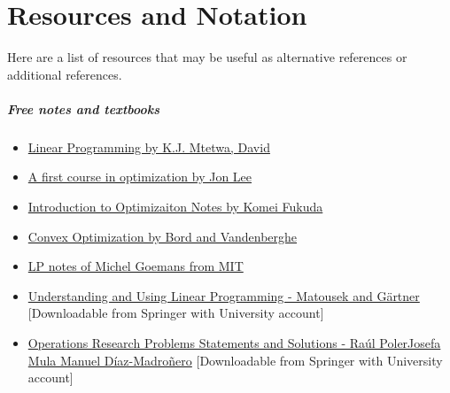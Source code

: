 \documentclass[letter,12pt]{book}
\renewcommand{\0}{\mathbf{0}}
\begin{document}
	\mainmatter
	
	


\chapter{Resources and Notation}
Here are a list of resources that may be useful as alternative references or additional references.

\paragraph{\textbf{Free notes and textbooks}}
\begin{itemize}
\item \href{https://oer.avu.org/handle/123456789/780}{Linear Programming by K.J. Mtetwa, David}
\item \href{http://www.optimization-online.org/DB_FILE/2013/12/4161.pdf}{A first course in optimization by Jon Lee}
\item \href{https://people.inf.ethz.ch/fukudak/lect/opt2011/aopt11note1.pdf}{Introduction to Optimizaiton Notes by Komei Fukuda}
\item \href{https://web.stanford.edu/~boyd/cvxbook/}{Convex Optimization by Bord and Vandenberghe}
\item  \href{http://math.mit.edu/~goemans/18310S15/lpnotes310.pdf}{LP notes of Michel Goemans from MIT }
\item \href{https://www.springer.com/gp/book/9783540306979}{Understanding and Using Linear Programming - Matousek and G\"artner} [Downloadable from Springer with University account]
\item \href{https://rd.springer.com/book/10.1007/978-1-4471-5577-5}{Operations Research Problems
Statements and Solutions
-
Ra\'ul PolerJosefa Mula Manuel D\'iaz-Madro\~nero} [Downloadable from Springer with University account]
\end{itemize}
\end{document}

